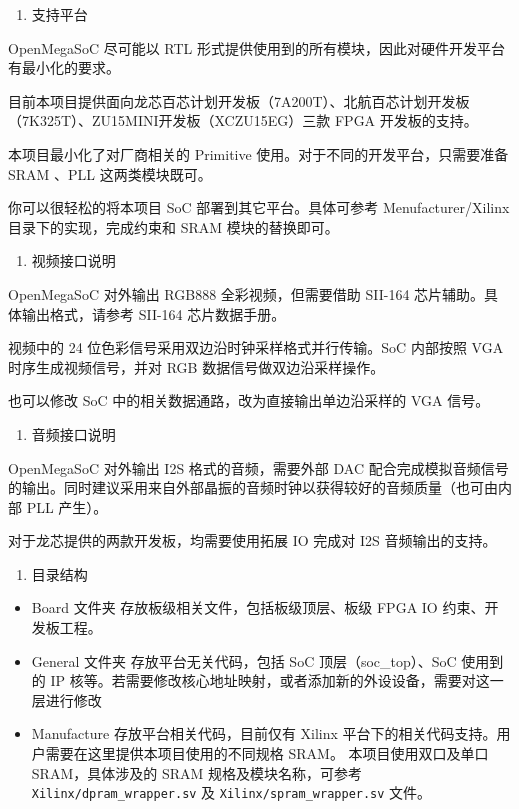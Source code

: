 \begin{enumerate}
\def\labelenumi{\arabic{enumi}.}
\setcounter{enumi}{4}
\tightlist
\item
  支持平台
\end{enumerate}

OpenMegaSoC 尽可能以 RTL 形式提供使用到的所有模块，因此对硬件开发平台有最小化的要求。

目前本项目提供面向龙芯百芯计划开发板（7A200T）、北航百芯计划开发板（7K325T）、ZU15MINI开发板（XCZU15EG）三款 FPGA 开发板的支持。

本项目最小化了对厂商相关的 Primitive 使用。对于不同的开发平台，只需要准备 SRAM 、PLL 这两类模块既可。

你可以很轻松的将本项目 SoC 部署到其它平台。具体可参考 Menufacturer/Xilinx 目录下的实现，完成约束和 SRAM 模块的替换即可。

\begin{enumerate}
\def\labelenumi{\arabic{enumi}.}
\setcounter{enumi}{5}
\tightlist
\item
  视频接口说明
\end{enumerate}

OpenMegaSoC 对外输出 RGB888 全彩视频，但需要借助 SII-164 芯片辅助。具体输出格式，请参考 SII-164 芯片数据手册。

视频中的 24 位色彩信号采用双边沿时钟采样格式并行传输。SoC 内部按照 VGA 时序生成视频信号，并对 RGB 数据信号做双边沿采样操作。

也可以修改 SoC 中的相关数据通路，改为直接输出单边沿采样的 VGA 信号。

\begin{enumerate}
\def\labelenumi{\arabic{enumi}.}
\setcounter{enumi}{6}
\tightlist
\item
  音频接口说明
\end{enumerate}

OpenMegaSoC 对外输出 I2S 格式的音频，需要外部 DAC 配合完成模拟音频信号的输出。同时建议采用来自外部晶振的音频时钟以获得较好的音频质量（也可由内部 PLL 产生）。

对于龙芯提供的两款开发板，均需要使用拓展 IO 完成对 I2S 音频输出的支持。

\begin{enumerate}
\def\labelenumi{\arabic{enumi}.}
\setcounter{enumi}{7}
\tightlist
\item
  目录结构
\end{enumerate}

\begin{itemize}
\tightlist
\item
  Board 文件夹 存放板级相关文件，包括板级顶层、板级 FPGA IO 约束、开发板工程。
\item
  General 文件夹 存放平台无关代码，包括 SoC 顶层（soc\_top）、SoC 使用到的 IP 核等。若需要修改核心地址映射，或者添加新的外设设备，需要对这一层进行修改
\item
  Manufacture 存放平台相关代码，目前仅有 Xilinx 平台下的相关代码支持。用户需要在这里提供本项目使用的不同规格 SRAM。 本项目使用双口及单口 SRAM，具体涉及的 SRAM 规格及模块名称，可参考 \texttt{Xilinx/dpram\_wrapper.sv} 及 \texttt{Xilinx/spram\_wrapper.sv} 文件。
\end{itemize}

